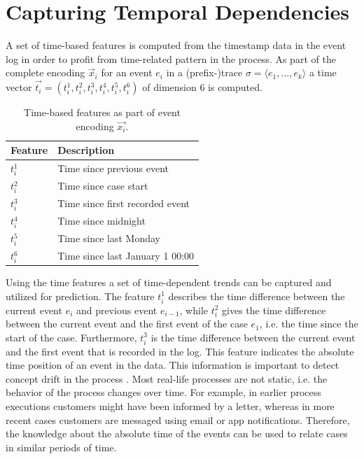 \section{Capturing Temporal Dependencies}\label{sec:time}

A set of time-based features is computed from the timestamp data in the event log in order to profit from time-related pattern in the process.
As part of the complete encoding $\vec{x}_i$ for an event $e_i$ in a (prefix-)trace $\sigma = \langle e_1, \dots, e_k \rangle$ a time vector $\vec{t_i} = (t_i^1, t_i^2,t_i^3,t_i^4,t_i^5,t_i^6)$ of dimension 6 is computed.

\begin{table}[!htbp]
	\centering
	\begin{tabularx}{0.6\textwidth}{l l}
		\toprule
		 \textbf{Feature} & \textbf{Description} \\
		 \midrule
		$t_i^1$ & Time since previous event \\
		$t_i^2$ & Time since case start \\
		$t_i^3$ & Time since first recorded event \\
		$t_i^4$ & Time since midnight \\
		$t_i^5$ & Time since last Monday \\
		$t_i^6$ & Time since last January 1 00:00 \\
		\bottomrule
	\end{tabularx}
	\caption[Time-based features as part of the event encoding]{Time-based features as part of event encoding $\vec{x_i}$.}
	\label{tab:time-features}
\end{table}

Using the time features a set of time-dependent trends can be captured and utilized for prediction.
The feature $t_i^1$ describes the time difference between the current event $e_i$ and previous event $e_{i-1}$, while $t_i^2$ gives the time difference between the current event and the first event of the case $e_1$, i.e. the time since the start of the case.
Furthermore, $t_i^3$ is the time difference between the current event and the first event that is recorded in the log. This feature indicates the absolute time position of an event in the data.
This information is important to detect concept drift in the process \cite{DBLP:journals/tnn/BoseAZP14}.
Most real-life processes are not static, i.e. the behavior of the process changes over time.
For example, in earlier process executions customers might have been informed by a letter, whereas in more recent cases customers are messaged using email or app notifications.
Therefore, the knowledge about the absolute time of the events can be used to relate cases in similar periods of time.

